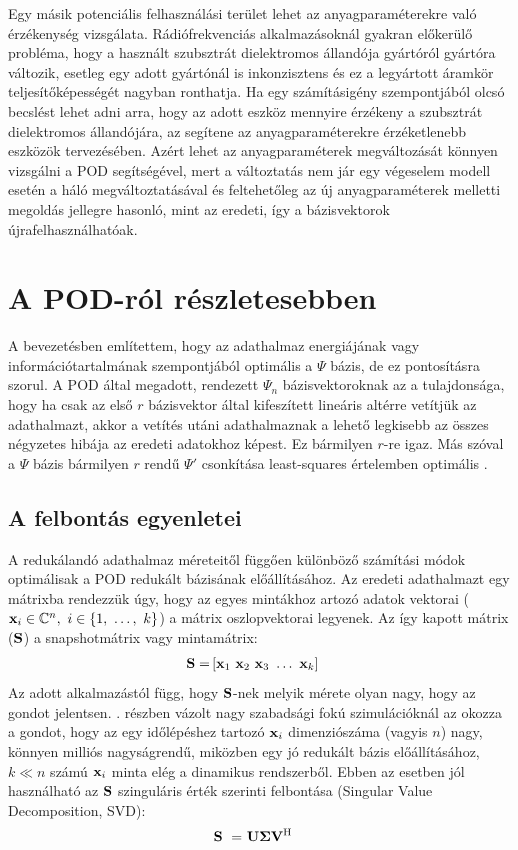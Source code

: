             \par
            Egy másik potenciális felhasználási terület lehet az anyagparaméterekre való érzékenység vizsgálata. Rádiófrekvenciás alkalmazásoknál gyakran előkerülő probléma, hogy a használt szubsztrát dielektromos állandója gyártóról gyártóra változik, esetleg egy adott gyártónál is inkonzisztens és ez a legyártott áramkör teljesítőképességét nagyban ronthatja. Ha egy számításigény szempontjából olcsó becslést lehet adni arra, hogy az adott eszköz mennyire érzékeny a szubsztrát dielektromos állandójára, az segítene az anyagparaméterekre érzéketlenebb eszközök tervezésében. Azért lehet az anyagparaméterek megváltozását könnyen vizsgálni a POD segítségével, mert a változtatás nem jár egy végeselem modell esetén a háló megváltoztatásával és feltehetőleg az új anyagparaméterek melletti megoldás jellegre hasonló, mint az eredeti, így a bázisvektorok újrafelhasználhatóak.
    \section{A POD-ról részletesebben}
    \label{sec:POD}
        A bevezetésben említettem, hogy az adathalmaz energiájának vagy információtartalmának szempontjából optimális a $\Psi$ bázis, de ez pontosításra szorul. A POD által megadott, rendezett $\Psi_n$ bázisvektoroknak az a tulajdonsága, hogy ha csak az első $r$ bázisvektor által kifeszített lineáris altérre vetítjük az adathalmazt, akkor a vetítés utáni adathalmaznak a lehető legkisebb az összes négyzetes hibája az eredeti adatokhoz képest. Ez bármilyen $r$-re igaz. Más szóval a $\Psi$ bázis bármilyen $r$ rendű $\Psi'$ csonkítása least-squares értelemben optimális \cite{Jolliffe16}.
        \subsection{A felbontás egyenletei}
            A redukálandó adathalmaz méreteitől függően különböző számítási módok optimálisak a POD redukált bázisának előállításához. Az eredeti adathalmazt egy mátrixba rendezzük úgy, hogy az egyes mintákhoz artozó adatok vektorai (${\bf x}_i \in \mathbb{C}^n,~i \in \{1,~\hdots,~k\}$) a mátrix oszlopvektorai legyenek. Az így kapott mátrix (${\bf S}$) a snapshotmátrix vagy mintamátrix:
            \begin{align}
                {\bf S} = & \left[ {\bf x}_1~{\bf x}_2~{\bf x}_3~\hdots~{\bf x}_k \right]
            \end{align}
            Az adott alkalmazástól függ, hogy ${\bf S}$-nek melyik mérete olyan nagy, hogy az gondot jelentsen. . részben vázolt nagy szabadsági fokú szimulációknál az okozza a gondot, hogy az egy időlépéshez tartozó ${\bf x}_i$ dimenziószáma (vagyis $n$) nagy, könnyen milliós nagyságrendű, miközben egy jó redukált bázis előállításához, $k \ll n$ számú ${\bf x}_i$ minta elég a dinamikus rendszerből. Ebben az esetben jól használható az ${\bf S}$ szinguláris érték szerinti felbontása (Singular Value Decomposition, SVD):
            \begin{align}
                \label{equ:svd}
                {\bf S}~=&~{\bf U \Sigma V^{\mathrm{H}}}
            \end{align}
